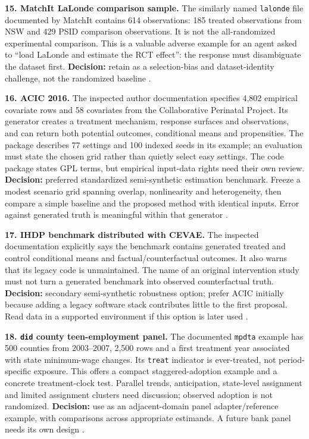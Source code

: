 \textbf{15. MatchIt LaLonde comparison sample.} The similarly named
\texttt{lalonde} file documented by MatchIt contains 614 observations:
185 treated observations from NSW and 429 PSID comparison observations.
It is not the all-randomized experimental comparison. This is a valuable
adverse example for an agent asked to ``load LaLonde and estimate the
RCT effect'': the response must disambiguate the dataset first.
\textbf{Decision:} retain as a selection-bias and dataset-identity
challenge, not the randomized baseline \citep{pd15_lalonde_pinned}.

\textbf{16. ACIC 2016.} The inspected author documentation specifies
4,802 empirical covariate rows and 58 covariates from the Collaborative
Perinatal Project. Its generator creates a treatment mechanism, response
surfaces and observations, and can return both potential outcomes,
conditional means and propensities. The package describes 77 settings
and 100 indexed seeds in its example; an evaluation must state the
chosen grid rather than quietly select easy settings. The code package
states GPL terms, but empirical input-data rights need their own review.
\textbf{Decision:} preferred standardized semi-synthetic estimation
benchmark. Freeze a modest scenario grid spanning overlap, nonlinearity
and heterogeneity, then compare a simple baseline and the proposed
method with identical inputs. Error against generated truth is
meaningful within that generator \citep{pd15_acic_pinned}.

\textbf{17. IHDP benchmark distributed with CEVAE.} The inspected
documentation explicitly says the benchmark contains generated treated
and control conditional means and factual/counterfactual outcomes. It
also warns that its legacy code is unmaintained. The name of an original
intervention study must not turn a generated benchmark into observed
counterfactual truth. \textbf{Decision:} secondary semi-synthetic
robustness option; prefer ACIC initially because adding a legacy
software stack contributes little to the first proposal. Read data in a
supported environment if this option is later used
\citep{pd15_cevae_pinned}.

\textbf{18. \texttt{did} county teen-employment panel.} The documented
\texttt{mpdta} example has 500 counties from 2003--2007, 2,500 rows and
a first treatment year associated with state minimum-wage changes. Its
\texttt{treat} indicator is ever-treated, not period-specific exposure.
This offers a compact staggered-adoption example and a concrete
treatment-clock test. Parallel trends, anticipation, state-level
assignment and limited assignment clusters need discussion; observed
adoption is not randomized. \textbf{Decision:} use as an adjacent-domain
panel adapter/reference example, with comparisons across appropriate
estimands. A future bank panel needs its own design \citep{pd15_mpdta}.

